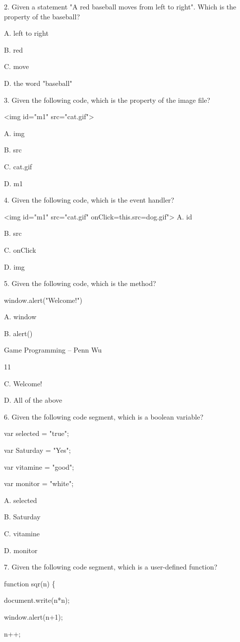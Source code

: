 \documentclass[
]{article}
\begin{document}
2. Given a statement "A red baseball moves from left to right". Which is
the property of the baseball?

A. left to right

B. red

C. move

D. the word "baseball"

3. Given the following code, which is the property of the image file?

\textless img id="m1" src="cat.gif"\textgreater{}

A. img

B. src

C. cat.gif

D. m1

4. Given the following code, which is the event handler?

\textless img id="m1" src="cat.gif"
onClick=\textquotesingle this.src=\textquotesingle dog.gif\textquotesingle"\textgreater{}
A. id

B. src

C. onClick

D. img

5. Given the following code, which is the method?

window.alert("Welcome!")

A. window

B. alert()

Game Programming -- Penn Wu

11

\protect\hypertarget{index_split_001.htmlux5cux23p12}{}{}C. Welcome!

D. All of the above

6. Given the following code segment, which is a boolean variable?

var selected = "true";

var Saturday = "Yes";

var vitamine = "good";

var monitor = "white";

A. selected

B. Saturday

C. vitamine

D. monitor

7. Given the following code segment, which is a user-defined function?

function sqr(n) \{

document.write(n*n);

window.alert(n+1);

n++;
\end{document}
